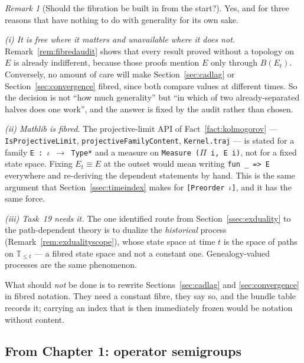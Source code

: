 \documentclass[11pt,a4paper]{article}
\theoremstyle{plain}
\theoremstyle{definition}
\theoremstyle{remark}
\newtheorem{remark}[theorem]{Remark}
\newcommand{\T}{\mathbb{T}}                     %
\newcommand{\Bdd}{B}                           %
\begin{document}
\begin{remark}[Should the fibration be built in from the start?]
  \label{rem:fibredrecommend}
  Yes, and for three reasons that have nothing to do with generality for its own
  sake.

  \emph{(i) It is free where it matters and unavailable where it does not.}
  Remark~\ref{rem:fibredaudit} shows that every result proved without a topology
  on $E$ is already indifferent, because those proofs mention $E$ only through
  $\Bdd(E_t)$.  Conversely, no amount of care will make Section~\ref{sec:cadlag}
  or Section~\ref{sec:convergence} fibred, since both compare values at different
  times.  So the decision is not ``how much generality'' but ``in which of two
  already-separated halves does one work'', and the answer is fixed by the audit
  rather than chosen.

  \emph{(ii) Mathlib is fibred.}  The projective-limit API of
  Fact~\ref{fact:kolmogorov} --- \texttt{IsProjectiveLimit},
  \texttt{projectiveFamilyContent}, \texttt{Kernel.traj} --- is stated for a
  family \texttt{E : $\iota$ $\to$ Type*} and a measure on
  \texttt{Measure ($\Pi$ i, E i)}, not
  for a fixed state space.  Fixing $E_t \equiv E$ at the outset would mean
  writing \texttt{fun \_ => E} everywhere and re-deriving the dependent
  statements by hand.  This is the same argument that
  Section~\ref{ssec:timeindex} makes for \texttt{[Preorder $\iota$]}, and it has
  the same force.

  \emph{(iii) Task~19 needs it.}  The one identified route from
  Section~\ref{ssec:exduality} to the path-dependent theory is to dualize the
  \emph{historical} process (Remark~\ref{rem:exdualityscope}), whose state space
  at time $t$ is the space of paths on $\T_{\leq t}$ --- a fibred state space and
  not a constant one.  Genealogy-valued processes are the same phenomenon.

  What should \emph{not} be done is to rewrite Sections~\ref{sec:cadlag} and
  \ref{sec:convergence} in fibred notation.  They need a constant fibre, they say
  so, and the bundle table records it; carrying an index that is then immediately
  frozen would be notation without content.
\end{remark}

\subsection{From Chapter 1: operator semigroups}
\label{ssec:ch1}
\end{document}
